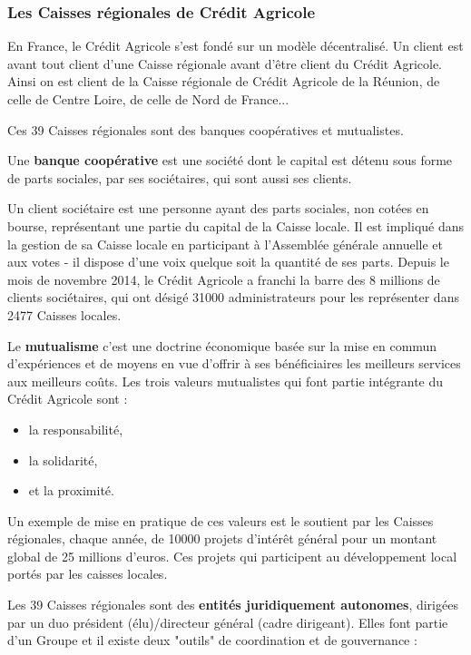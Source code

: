 \documentclass[12pt,a4paper]{article}
\begin{document}
\subsubsection{Les Caisses régionales de Crédit Agricole}
En France, le Crédit Agricole s'est fondé sur un modèle décentralisé. Un client est avant tout client d'une Caisse régionale avant d'être client du Crédit Agricole. Ainsi on est client de la Caisse régionale de Crédit Agricole de la Réunion, de celle de Centre Loire, de celle de Nord de France... \par 
Ces 39 Caisses régionales sont des banques coopératives et mutualistes.\par 
Une \textbf{banque coopérative} est une société dont le capital est détenu sous forme de parts sociales, par ses sociétaires, qui sont aussi ses clients.\par
Un client sociétaire est une personne ayant des parts sociales, non cotées en bourse, représentant une partie du capital de la Caisse locale. Il est impliqué dans la gestion de sa Caisse locale en participant à l'Assemblée générale annuelle et aux votes - il dispose d'une voix quelque soit la quantité de ses parts. Depuis le mois de novembre 2014, le Crédit Agricole a franchi la barre des 8 millions de clients sociétaires, qui ont désigé 31000 administrateurs pour les représenter dans 2477 Caisses locales.\par
\par 
Le \textbf{mutualisme} c'est une doctrine économique basée sur la mise en commun d'expériences et de moyens en vue d'offrir à ses bénéficiaires les meilleurs services aux meilleurs coûts. Les trois valeurs mutualistes qui font partie intégrante du Crédit Agricole sont :
\begin{itemize}
\item la responsabilité,
\item la solidarité,
\item et la proximité.
\end{itemize}
Un exemple de mise en pratique de ces valeurs est le soutient par les Caisses régionales, chaque année, de 10000 projets d'intérêt général pour un montant global de 25 millions d'euros. Ces projets qui participent au développement local portés par les caisses locales.\par 
Les 39 Caisses régionales sont des \textbf{entités juridiquement autonomes}, dirigées par un duo président (élu)/directeur général (cadre dirigeant). Elles font partie d'un Groupe et il existe deux "outils" de coordination et de gouvernance : \par 
\end{document}
